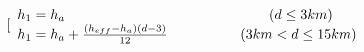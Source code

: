\documentclass[runningheads,a4paper]{llncs}
\begin{document}
 \begin{equation}
[\begin{array}{l}
{h_1} = {h_a}{\kern 1pt} {\kern 1pt} {\kern 1pt} {\kern 1pt} {\kern 1pt} {\kern 1pt} {\kern 1pt} {\kern 1pt} {\kern 1pt} {\kern 1pt} {\kern 1pt} {\kern 1pt} {\kern 1pt} {\kern 1pt} {\kern 1pt} {\kern 1pt} {\kern 1pt} {\kern 1pt} {\kern 1pt} {\kern 1pt} {\kern 1pt} {\kern 1pt} {\kern 1pt} {\kern 1pt} {\kern 1pt} {\kern 1pt} {\kern 1pt} {\kern 1pt} {\kern 1pt} {\kern 1pt} {\kern 1pt} {\kern 1pt} {\kern 1pt} {\kern 1pt} {\kern 1pt} {\kern 1pt} {\kern 1pt} {\kern 1pt} {\kern 1pt} {\kern 1pt} {\kern 1pt} {\kern 1pt} {\kern 1pt} {\kern 1pt} {\kern 1pt} {\kern 1pt} {\kern 1pt} {\kern 1pt} {\kern 1pt} {\kern 1pt} {\kern 1pt} {\kern 1pt} {\kern 1pt} {\kern 1pt} {\kern 1pt} {\kern 1pt} {\kern 1pt} {\kern 1pt} {\kern 1pt} {\kern 1pt} {\kern 1pt} {\kern 1pt} {\kern 1pt} {\kern 1pt} {\kern 1pt} {\kern 1pt} {\kern 1pt} {\kern 1pt} {\kern 1pt} {\kern 1pt} {\kern 1pt} {\kern 1pt} {\kern 1pt} {\kern 1pt} {\kern 1pt} {\kern 1pt} {\kern 1pt} {\kern 1pt} {\kern 1pt} {\kern 1pt} {\kern 1pt} {\kern 1pt} {\kern 1pt} {\kern 1pt} {\kern 1pt} {\kern 1pt} {\kern 1pt} {\kern 1pt} {\kern 1pt} {\kern 1pt} {\kern 1pt} {\kern 1pt} {\kern 1pt} {\kern 1pt} {\kern 1pt} {\kern 1pt} {\kern 1pt} {\kern 1pt} {\kern 1pt} {\kern 1pt} {\kern 1pt} {\kern 1pt} {\kern 1pt} {\kern 1pt} {\kern 1pt} {\kern 1pt} {\kern 1pt} {\kern 1pt} {\kern 1pt} {\kern 1pt} {\kern 1pt} {\kern 1pt} {\kern 1pt} {\kern 1pt} {\kern 1pt} {\kern 1pt} {\kern 1pt} {\kern 1pt} {\kern 1pt} {\kern 1pt} {\kern 1pt} {\kern 1pt} {\kern 1pt} {\kern 1pt} {\kern 1pt} {\kern 1pt} {\kern 1pt} {\kern 1pt} {\kern 1pt} {\kern 1pt} {\kern 1pt} {\kern 1pt} {\kern 1pt} {\kern 1pt} {\kern 1pt} {\kern 1pt} {\kern 1pt} {\kern 1pt} {\kern 1pt} {\kern 1pt} {\kern 1pt} {\kern 1pt} {\kern 1pt} {\kern 1pt} {\kern 1pt} {\kern 1pt} (d \le 3km)\\
{h_1} = {h_a} + \frac{{({h_{eff}} - {h_a})(d - 3)}}{{12}}{\kern 1pt} {\kern 1pt} {\kern 1pt} {\kern 1pt} {\kern 1pt} {\kern 1pt} {\kern 1pt} {\kern 1pt} {\kern 1pt} {\kern 1pt} {\kern 1pt} {\kern 1pt} {\kern 1pt} {\kern 1pt} {\kern 1pt} {\kern 1pt} {\kern 1pt} {\kern 1pt} {\kern 1pt} {\kern 1pt} {\kern 1pt} {\kern 1pt} {\kern 1pt} {\kern 1pt} {\kern 1pt} {\kern 1pt} {\kern 1pt} {\kern 1pt} {\kern 1pt} {\kern 1pt} {\kern 1pt} {\kern 1pt} {\kern 1pt} {\kern 1pt} {\kern 1pt} {\kern 1pt} {\kern 1pt} {\kern 1pt} {\kern 1pt} {\kern 1pt} {\kern 1pt} {\kern 1pt} {\kern 1pt} {\kern 1pt} {\kern 1pt} {\kern 1pt} {\kern 1pt} {\kern 1pt} {\kern 1pt} {\kern 1pt} {\kern 1pt} {\kern 1pt} (3km < d \le 15km)\\

\end{array}
\end{equation}
\end{document}
